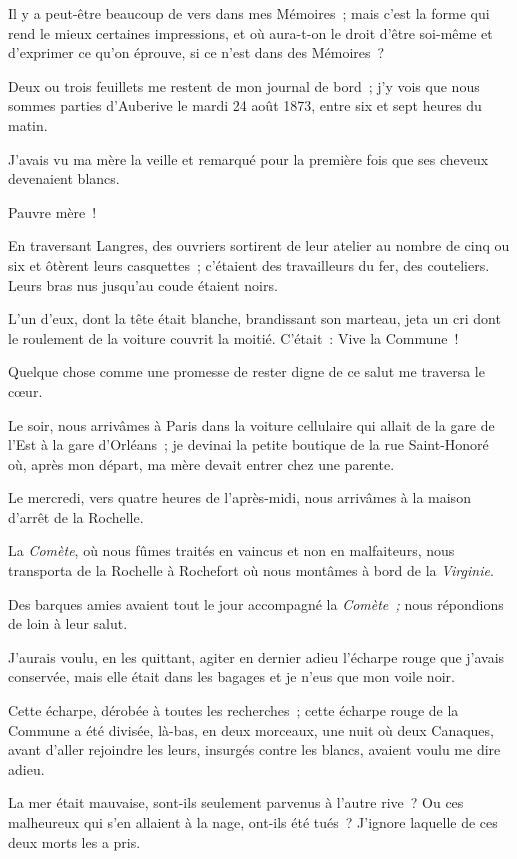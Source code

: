 \documentclass[french,twoside]{book} %
\begin{document}
\noindent Il y a peut-être beaucoup de vers dans mes Mémoires ; mais c’est la forme qui rend le mieux certaines impressions, et où aura-t-on le droit d’être soi-même et d’exprimer ce qu’on éprouve, si ce n’est dans des Mémoires ?\par
Deux ou trois feuillets me restent de mon journal de bord ; j’y vois que nous sommes parties  d’Auberive le mardi 24 août 1873, entre six et sept heures du matin.\par
J’avais vu ma mère la veille et remarqué pour la première fois que ses cheveux devenaient blancs.\par
Pauvre mère !\par
En traversant Langres, des ouvriers sortirent de leur atelier au nombre de cinq ou six et ôtèrent leurs casquettes ; c’étaient des travailleurs du fer, des couteliers. Leurs bras nus jusqu’au coude étaient noirs.\par
L’un d’eux, dont la tête était blanche, brandissant son marteau, jeta un cri dont le roulement de la voiture couvrit la moitié. C’était : Vive la Commune !\par
Quelque chose comme une promesse de rester digne de ce salut me traversa le cœur.\par
Le soir, nous arrivâmes à Paris dans la voiture cellulaire qui allait de la gare de l’Est à la gare d’Orléans ; je devinai la petite boutique de la rue Saint-Honoré où, après mon départ, ma mère devait entrer chez une parente.\par
Le mercredi, vers quatre heures de l’après-midi, nous arrivâmes à la maison d’arrêt de la Rochelle.\par
La \emph{Comète}, où nous fûmes traités en vaincus et non en malfaiteurs, nous transporta de la Rochelle  à Rochefort où nous montâmes à bord de la \emph{Virginie}.\par
Des barques amies avaient tout le jour accompagné la \emph{Comète ;} nous répondions de loin à leur salut.\par
J’aurais voulu, en les quittant, agiter en dernier adieu l’écharpe rouge que j’avais conservée, mais elle était dans les bagages et je n’eus que mon voile noir.\par
Cette écharpe, dérobée à toutes les recherches ; cette écharpe rouge de la Commune a été divisée, là-bas, en deux morceaux, une nuit où deux Canaques, avant d’aller rejoindre les leurs, insurgés contre les blancs, avaient voulu me dire adieu.\par
La mer était mauvaise, sont-ils seulement parvenus à l’autre rive ? Ou ces malheureux qui s’en allaient à la nage, ont-ils été tués ? J’ignore laquelle de ces deux morts les a pris.\par
\end{document}
